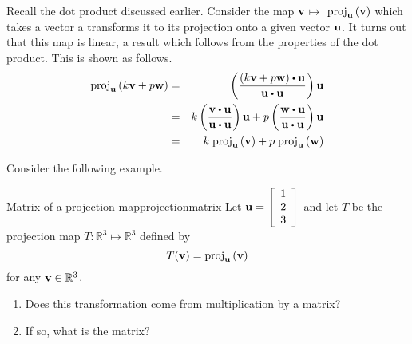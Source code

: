 Recall the dot product discussed earlier. Consider the map ${\bf v}$\textbf{$\mapsto $}
$\mbox{proj}_{{\bf u}}\left( {\bf v}\right) $ which takes a vector a transforms it to its projection onto a given vector ${\bf u}$. It turns out that
this map is linear, a result which follows from the properties of the
dot product. This is shown as follows.
\begin{eqnarray*}
\func{proj}_{\vect{u}}\left( k \vect{v}+ p \vect{w}\right)
&=&\left( \vspace{0.05in}\frac{(k \vect{v}+ p \vect{w})\dotprod \vect{u}}{
\vect{u}\dotprod \vect{u}}\right) \vect{u} \\
&=& k  \left( \vspace{0.05in}\frac{
\vect{v}\dotprod \vect{u}}{\vect{u}\dotprod \vect{u}}\right) \vect{u}+p \left( \vspace{
0.05in}\frac{\vect{w}\dotprod \vect{u}}{\vect{u}\dotprod \vect{u}}\right) \vect{u} \\
&=& k \; \func{proj}_{\vect{u}}\left( \vect{v}\right) +p \; \func{proj}
_{\vect{u}}\left( \vect{w}\right) 
\end{eqnarray*}

Consider the following example.

\begin{example}{Matrix of a projection map}{projectionmatrix}
Let ${\bf u} = \left[ \begin{array}{r}
1 \\
2 \\
3
\end{array}
\right]$ and let $T$ be the projection map $T: \mathbb{R}^3 \mapsto \mathbb{R}^3$ defined by 
\[
T({\bf v}) = \mbox{proj}_{{\bf u}}\left( {\bf v}\right)
\]
for any ${\bf v} \in \mathbb{R}^3$.  
\begin{enumerate}
\item Does this transformation come from
multiplication by a matrix?
\item If so, what is the matrix?
\end{enumerate}
\end{example}


